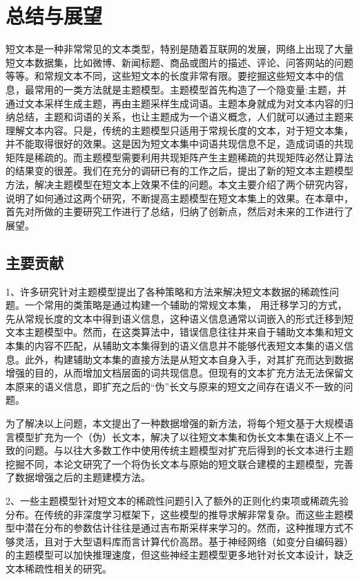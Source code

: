\chapter{总结与展望}
短文本是一种非常常见的文本类型，特别是随着互联网的发展，网络上出现了大量短文本数据集，比如微博、新闻标题、商品或图片的描述、评论、问答网站的问题等等。和常规文本不同，这些短文本的长度非常有限。要挖掘这些短文本中的信息，最常用的一类方法就是主题模型。主题模型首先构造了一个隐变量:主题，并通过文本采样生成主题，再由主题采样生成词语。主题本身就成为对文本内容的归纳总结，主题和词语的关系，也让主题成为一个语义概念，人们就可以通过主题来理解文本内容。只是，传统的主题模型只适用于常规长度的文本，对于短文本集，并不能取得很好的效果。这是因为短文本集中词语共现信息不足，造成词语的共现矩阵是稀疏的。而主题模型需要利用共现矩阵产生主题稀疏的共现矩阵必然让算法的结果变的很差。我们在充分的调研已有的工作之后，提出了新的短文本主题模型方法，解决主题模型在短文本上效果不佳的问题。本文主要介绍了两个研究内容，说明了如何通过这两个研究，不断提高主题模型在短文本集上的效果。在本章中，首先对所做的主要研究工作进行了总结，归纳了创新点，然后对未来的工作进行了展望。

\section{主要贡献}

1、许多研究针对主题模型提出了各种策略和方法来解决短文本数据的稀疏性问题。一个常用的类策略是通过构建一个辅助的常规文本集， 用迁移学习的方式，先从常规长度的文本中得到语义信息，这种语义信息通常以词嵌入的形式迁移到短文本主题模型中。然而，在这类算法中，错误信息往往并来自于辅助文本集和短文本集的内容不匹配，从辅助文本集得到的语义信息并不能够代表短文本集的语义信息。此外，构建辅助文本集的直接方法是从短文本自身入手，对其扩充而达到数据增强的目的，从而增加文档层面的词共现信息。但现有的文本扩充方法无法保留文本原来的语义信息，即扩充之后的“伪”长文与原来的短文之间存在语义不一致的问题。

为了解决以上问题，本文提出了一种数据增强的新方法，将每个短文基于大规模语言模型扩充为一个（伪）长文本，解决了以往短文本集和伪长文本集在语义上不一致的问题。与以往大多数工作中使用传统主题模型对扩充后得到的长文本进行主题挖掘不同，本论文研究了一个将伪长文本与原始的短文联合建模的主题模型，完善了数据增强之后的主题建模方法。

2、一些主题模型针对短文本的稀疏性问题引入了额外的正则化约束项或稀疏先验分布。在传统的非深度学习框架下，这些模型的推导求解非常复杂。而这些主题模型中潜在分布的参数估计往往是通过吉布斯采样来学习的。然而，这种推理方式不够灵活，且对于大型语料库而言计算代价高昂。基于神经网络（如变分自编码器）的主题模型可以加快推理速度，但这些神经主题模型更多地针对长文本设计，缺乏文本稀疏性相关的研究。

